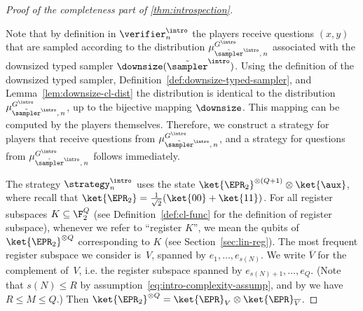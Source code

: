 \begin{proof}[Proof of the completeness part of \cref{thm:introspection}]
  \begin{remark}
    \label{rk:downsizing}
    Note that by definition in $\verifier_n^\intro$ the players receive
    questions $(x,y)$ that are sampled according to the distribution
    $\mu_{\tsint,\, n}^{G^\intro}$ associated with the downsized typed
    sampler $\downsize(\tilde{\sampler}^\intro)$.
    Using the definition of the downsized typed sampler,
    Definition~\ref{def:downsize-typed-sampler}, and
    Lemma~\ref{lem:downsize-cl-dist} the distribution is identical to the
    distribution $\mu_{\tilde{\sampler}^\intro,\, n}^{G^\intro}$, up to the
    bijective mapping $\downsize$.
    This mapping can be computed by the players themselves.
    Therefore, we construct a strategy for players that receive questions from
    $\mu_{\tilde{\sampler}^\intro,\, n}^{G^\intro}$, and a strategy for
    questions from $\mu_{\tsint,\, n}^{G^\intro}$ follows immediately.
  \end{remark}

  The strategy $\strategy^\intro_n$ uses the state $\ket{\EPR_2}^{\otimes (Q+1)}
  \otimes \ket{\aux}$, where recall that $\ket{\EPR_2} =
  \frac{1}{\sqrt{2}}(\ket{00}+\ket{11})$.
  For all register subspaces $K \subseteq \F_2^{Q}$ (see
  Definition~\ref{def:cl-func} for the definition of register subspace),
  whenever we refer to ``register $K$'', we mean the qubits of
  $\ket{\EPR_2}^{\otimes Q}$ corresponding to $K$ (see
  Section~\ref{sec:lin-reg}).
  The most frequent register subspace we consider is~$V$, spanned by $e_1,
  \ldots, e_{s(N)}$.
  We write $\overline{V}$ for the complement of~$V$, i.e.
  the register subspace spanned by $e_{s(N)+1}, \ldots, e_{Q}$.
  (Note that $s(N) \leq R$ by
  assumption~\eqref{eq:intro-complexity-assump},  and by  we have $R \leq M \leq Q$.)
  Then $\ket{\EPR_2}^{\otimes Q} = \ket{\EPR}_V \otimes
  \ket{\EPR}_{\overline{V}}$.


\end{proof}
